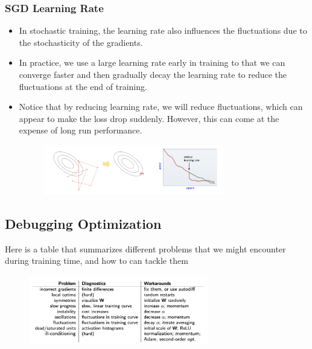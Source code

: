 \documentclass[11pt]{article}
\begin{document}
\subsubsection{SGD Learning Rate}
\begin{itemize}
    \item In stochastic training, the learning rate also influences the fluctuations due to the stochasticity of the gradients. 
    \item In practice, we use a large learning rate early in training to that we can converge faster and then gradually decay the learning rate to reduce the fluctuations at the end of training. 
    \item Notice that by reducing learning rate, we will reduce fluctuations, which can appear to make the loss drop suddenly. However, this can come at the expense of long run performance. \cite{week4}
        \begin{figure}[H]
            \center \includegraphics[width=0.75\textwidth]{img/sgd_lr}
        \end{figure}
\end{itemize}

\subsection{Debugging Optimization}
Here is a table that summarizes different problems that we might encounter during training time, and how to can tackle them \cite{week4}
\begin{figure}[H]
    \center\includegraphics[width=0.7\textwidth]{img/training_problems}
\end{figure}
\end{document}
